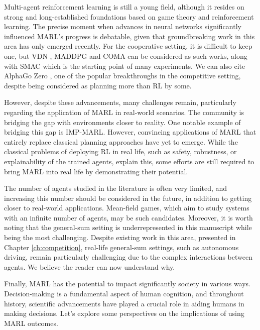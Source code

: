 Multi-agent reinforcement learning is still a young field, although it resides on strong and long-established foundations based on game theory and reinforcement learning.
The precise moment when advances in neural networks significantly influenced MARL's progress is debatable, given that groundbreaking work in this area has only emerged recently.
For the cooperative setting, it is difficult to keep one, but VDN \citep{sunehag2018vdn}, MADDPG \cite{lowe2017multi} and COMA \citep{foerster2017coma} can be considered as such works, along with SMAC \citep{samvelyan2019starcraft} which is the starting point of many experiments.
We can also cite AlphaGo Zero \citep{silver2017mastering}, one of the popular breakthroughs in the competitive setting, despite being considered as planning more than RL by some.

However, despite these advancements, many challenges remain, particularly regarding the application of MARL in real-world scenarios.
The community is bridging the gap with environments closer to reality.
One notable example of bridging this gap is IMP-MARL.
However, convincing applications of MARL that entirely replace classical planning approaches have yet to emerge.
While the classical problems of deploying RL in real life, such as safety, robustness, or explainability of the trained agents, explain this, some efforts are still required to bring MARL into real life by demonstrating their potential.

The number of agents studied in the literature is often very limited, and increasing this number should be considered in the future, in addition to getting closer to real-world applications.
Mean-field games, which aim to study systems with an infinite number of agents, may be such candidates.
Moreover, it is worth noting that the general-sum setting is underrepresented in this manuscript while being the most challenging.
Despite existing work in this area, presented in Chapter \ref{ch:competition}, real-life general-sum settings, such as autonomous driving, remain particularly challenging due to the complex interactions between agents.
We believe the reader can now understand why.

Finally, MARL has the potential to impact significantly society in various ways.
Decision-making is a fundamental aspect of human cognition, and throughout history, scientific advancements have played a crucial role in aiding humans in making decisions.
Let's explore some perspectives on the implications of using MARL outcomes.

